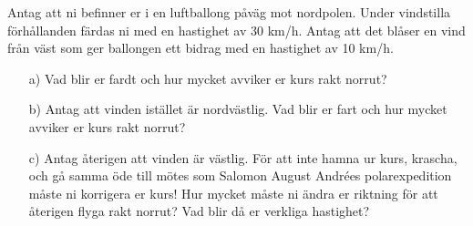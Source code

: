 Antag att ni befinner er i en luftballong påväg mot nordpolen. Under vindstilla förhållanden färdas ni med en hastighet av 30 km/h. Antag att det blåser en vind från väst som ger ballongen ett bidrag med en hastighet av 10 km/h.
\begin{itemize}
\item[a) ] Vad blir er fardt och hur mycket avviker er kurs rakt norrut?
\item[b) ] Antag att vinden istället är nordvästlig. Vad blir er fart och hur mycket avviker er kurs rakt norrut?
\item[c) ] Antag återigen att vinden är västlig. För att inte hamna ur kurs, krascha, och gå samma öde till mötes som Salomon August Andrées polarexpedition måste ni korrigera er kurs! Hur mycket måste ni ändra er riktning för att återigen flyga rakt norrut? Vad blir då er verkliga hastighet?
\end{itemize}

